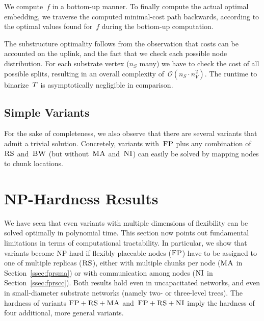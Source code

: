 We compute~$f$ in a bottom-up manner. 
To finally compute the actual optimal embedding,
we traverse the computed minimal-cost path backwards,
according to
the optimal values found for~$f$ during the bottom-up computation.


The substructure optimality follows from the observation that
costs can be accounted on the uplink, and the fact
 that we check each possible node distribution.
For each substrate vertex ($n_S$ many) we have
to check the cost of all possible splits,
resulting in an overall complexity of~$\mathcal{O}(n_S \cdot n_V^2)$.
The runtime to binarize~$T$ is asymptotically negligible in comparison.


\subsection{Simple Variants}



For the sake of completeness, we also observe that there are
several variants that admit a trivial solution. Concretely, variants with~$\textsc{FP}$
plus any combination of
$\textsc{RS}$ and~$\textsc{BW}$ (but without~$\textsc{MA}$ and~$\textsc{NI}$) can easily be solved by
mapping
nodes to chunk locations.

\section{NP-Hardness Results}\label{sec:np}

We have seen that even variants with multiple dimensions of
flexibility can be solved optimally in polynomial time.
This section now points out fundamental
limitations in terms of computational tractability.
In particular, we
show that variants become NP-hard if flexibly placeable nodes ($\textsc{FP}$) have to be assigned to one of multiple replicas ($\textsc{RS}$), either with multiple chunks per node ($\textsc{MA}$ in Section~\ref{ssec:fprsma}) or with communication among nodes ($\textsc{NI}$ in Section~\ref{ssec:fprscc}).
Both results hold even in uncapacitated networks, and even in small-diameter
substrate networks (namely two- or three-level trees).
The hardness of variants $\textsc{FP}+\textsc{RS}+\textsc{MA}$ and~$\textsc{FP}+\textsc{RS}+\textsc{NI}$ imply
the hardness of four additional, more general variants.

